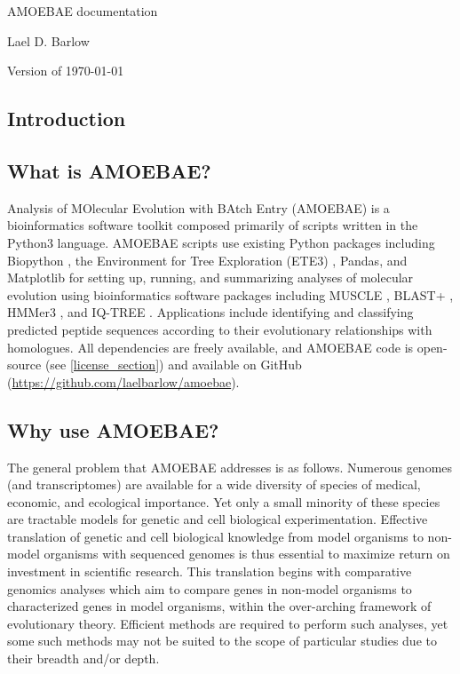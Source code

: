 \documentclass[12pt,letterpaper]{article}
\begin{document}
\begin{titlepage}
	\centering
    {\huge AMOEBAE documentation\par}
	\vspace{2cm}
    {\Large Lael D. Barlow\par}
	\vfill
	{\large Version of \today\par}
\end{titlepage}

\newpage
\tableofcontents

\newpage
{}
\begin{linenumbers}

\section{Introduction}


\subsection{What is AMOEBAE?}

Analysis of MOlecular Evolution with BAtch Entry (AMOEBAE) is a bioinformatics
    software toolkit composed primarily of scripts written in the Python3
    language. AMOEBAE scripts use existing Python packages including Biopython
    \citep{cock2009}, the Environment for Tree Exploration (ETE3)
    \citep{huerta-cepas2016}, Pandas, and Matplotlib \citep{hunter2007} for
    setting up, running, and summarizing analyses of molecular evolution using
    bioinformatics software packages including MUSCLE \citep{edgar2004}, BLAST+
    \citep{camacho2009}, HMMer3 \citep{eddy1998}, and IQ-TREE
    \citep{nguyen2015}. Applications include identifying and classifying
    predicted peptide sequences according to their evolutionary relationships
    with homologues. All dependencies are freely available, and AMOEBAE code is
    open-source (see \autoref*{license_section}) and available on GitHub
    (\url{https://github.com/laelbarlow/amoebae}). 

\subsection{Why use AMOEBAE?}
    
    The general problem that AMOEBAE addresses is as follows. Numerous genomes
    (and transcriptomes) are available for a wide diversity of species of
    medical, economic, and ecological importance. Yet only a small minority of
    these species are tractable models for genetic and cell biological
    experimentation. Effective translation of genetic and cell biological
    knowledge from model organisms to non-model organisms with sequenced
    genomes is thus essential to maximize return on investment in scientific
    research. This translation begins with comparative genomics analyses which
    aim to compare genes in non-model organisms to characterized genes in model
    organisms, within the over-arching framework of evolutionary theory.
    Efficient methods are required to perform such analyses, yet some such
    methods may not be suited to the scope of particular studies due to
    their breadth and/or depth. 


\end{linenumbers}
\end{document}
